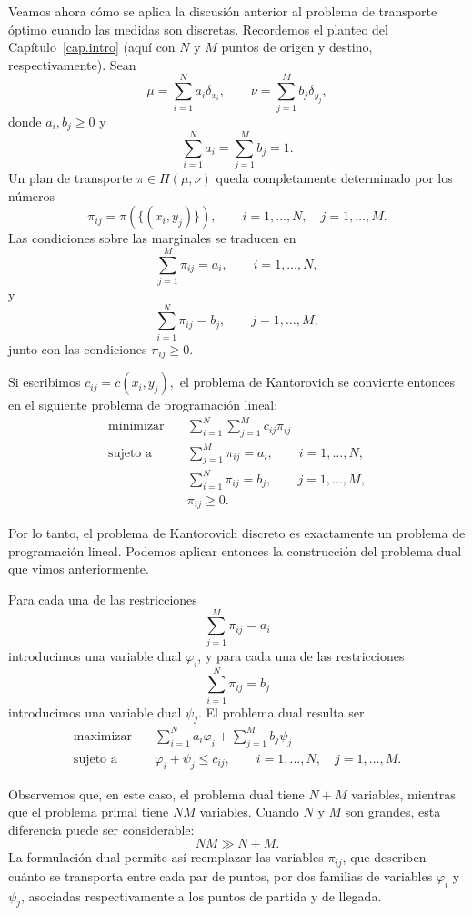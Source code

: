 \documentclass[12pt, a4paper]{amsbook}
\theoremstyle{remark}
\theoremstyle{definition}
\numberwithin{section}{chapter}
\numberwithin{subsection}{section}
\numberwithin{equation}{section}
\numberwithin{figure}{chapter}
\begin{document}
Veamos ahora cómo se aplica la discusión anterior al problema de transporte
óptimo cuando las medidas son discretas. Recordemos el planteo del
Capítulo~\ref{cap.intro} (aquí con $N$ y $M$ puntos
de origen y destino, respectivamente). Sean
\[
\mu=\sum_{i=1}^N a_i\delta_{x_i},
\qquad
\nu=\sum_{j=1}^M b_j\delta_{y_j},
\]
donde $a_i,b_j\geq0$ y
\[
\sum_{i=1}^N a_i=\sum_{j=1}^M b_j=1.
\]
Un plan de transporte $\pi\in\Pi(\mu,\nu)$ queda completamente determinado
por los números
\[
\pi_{ij}=\pi(\{(x_i,y_j)\}),
\qquad
i=1,\ldots,N,\quad j=1,\ldots,M.
\]
Las condiciones sobre las marginales se traducen en
\[
\sum_{j=1}^M\pi_{ij}=a_i,
\qquad i=1,\ldots,N,
\]
y
\[
\sum_{i=1}^N\pi_{ij}=b_j,
\qquad j=1,\ldots,M,
\]
junto con las condiciones
\(
\pi_{ij}\geq0.
\)

Si escribimos
\(
c_{ij}=c(x_i,y_j),
\)
el problema de Kantorovich se convierte entonces en el siguiente problema
de programación lineal:
\[
\begin{aligned}
\text{minimizar}\quad&
\sum_{i=1}^N\sum_{j=1}^M c_{ij}\pi_{ij}\\
\text{sujeto a}\quad&
\sum_{j=1}^M\pi_{ij}=a_i,
\qquad i=1,\ldots,N,\\
&
\sum_{i=1}^N\pi_{ij}=b_j,
\qquad j=1,\ldots,M,\\
&
\pi_{ij}\geq0.
\end{aligned}
\]

Por lo tanto, el problema de Kantorovich discreto es exactamente un
problema de programación lineal. Podemos aplicar entonces la construcción
del problema dual que vimos anteriormente.

Para cada una de las restricciones
\[
\sum_{j=1}^M\pi_{ij}=a_i
\]
introducimos una variable dual $\varphi_i$, y para cada una de las
restricciones
\[
\sum_{i=1}^N\pi_{ij}=b_j
\]
introducimos una variable dual $\psi_j$. El problema dual resulta ser
\[
\begin{aligned}
\text{maximizar}\quad&
\sum_{i=1}^N a_i\varphi_i
+
\sum_{j=1}^M b_j\psi_j\\
\text{sujeto a}\quad&
\varphi_i+\psi_j\leq c_{ij},
\qquad
i=1,\ldots,N,\quad j=1,\ldots,M.
\end{aligned}
\]

Observemos que, en este caso, el problema dual tiene $N+M$ variables,
mientras que el problema primal tiene $NM$ variables. Cuando $N$ y $M$ son
grandes, esta diferencia puede ser considerable:
\[
NM\gg N+M.
\]
La formulación dual permite así reemplazar las variables $\pi_{ij}$, que
describen cuánto se transporta entre cada par de puntos, por dos familias de
variables $\varphi_i$ y $\psi_j$, asociadas respectivamente a los puntos de
partida y de llegada.
\end{document}
